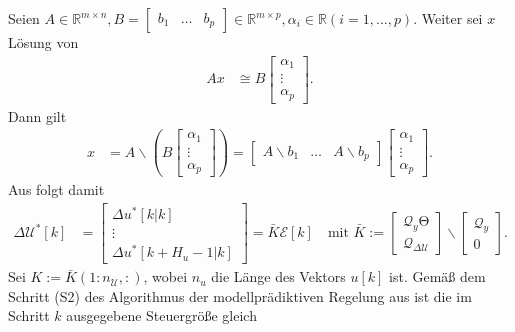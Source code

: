 \begin{remark}
Seien $A\in\mathbb{R}^{m\times n}, B=\begin{bmatrix} b_1 & \ldots & b_p \end{bmatrix}\in\mathbb{R}^{m\times p},\alpha_i\in\mathbb{R} (i=1,\ldots,p)$. Weiter sei $x$ Lösung von
\begin{align*}
	A x & \cong B\begin{bmatrix}
	\alpha_1\\ \vdots\\ \alpha_p
	\end{bmatrix}.
\end{align*}
Dann gilt
\begin{align}
	x & = A\backslash(B\begin{bmatrix}
	\alpha_1 \\ \vdots\\ \alpha_p
	\end{bmatrix})= \begin{bmatrix}
	A\backslash b_1 & \ldots & A\backslash b_p
	\end{bmatrix}\begin{bmatrix}
	\alpha_1 \\ \vdots\\ \alpha_p
	\end{bmatrix}.\label{eqn:kap_4_berechnung_x}
\end{align}
Aus  folgt damit
\begin{align*}
	\Delta\mathcal{U}^{\ast}[k] & = \begin{bmatrix}
	\Delta u^{\ast}[k|k]\\ \vdots\\ \Delta u^{\ast}[k+H_u-1|k]
	\end{bmatrix}=\bar{K}\mathcal{E}[k]\quad\text{mit }\bar{K}:=\begin{bmatrix}
	\mathcal{Q}_y\mathrm{\Theta}\\ \mathcal{Q}_{\Delta\mathcal{U}}
	\end{bmatrix}\backslash\begin{bmatrix}
	\mathcal{Q}_y\\ 0
	\end{bmatrix}.
\end{align*}
Sei $K:=\bar{K}(1:n_{\mathcal{U}},:)$, wobei $n_{u}$ die Länge des Vektors $u[k]$ ist. Gemäß dem Schritt (S2) des Algorithmus der modellprädiktiven Regelung aus
 ist die im Schritt $k$ ausgegebene Steuergröße gleich
\begin{align*}

\end{align*}
\end{remark}
